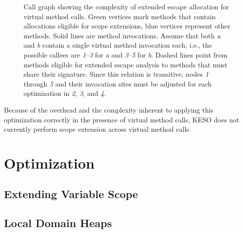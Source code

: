 			\begin{figure}
				\centering%

				\caption[Call graph showing the complexity of extended escape allocation for virtual method calls]{%
					Call graph showing the complexity of extended escape allocation for virtual method calls. Green
					{\color{cggreen}\blacksquare} vertices mark methods that contain allocations eligible for scope extensions,
					blue {\color{cgblue}\blacksquare} vertices represent other methods. Solid lines are method invocations. Assume
					that both \emph{a} and \emph{b} contain a single virtual method invocation each, i.e., the possible callees
					are \emph{1}–\emph{3} for \emph{a} and \emph{3}–\emph{5} for \emph{b}. Dashed lines point from methods
					eligible for extended escape analysis to methods that must share their signature. Since this relation is
					transitive, nodes \emph{1} through \emph{5} and their invocation sites must be adjusted for each optimization
					in \emph{2}, \emph{3}, and \emph{4}.}%
				\label{fig:eea:analysis:virtual}%
			\end{figure}

			Because of the overhead and the complexity inherent to applying this optimization correctly in the presence of
			virtual method calls, KESO does not currently perform scope extension across virtual method calls.


	\section{Optimization}
		\label{sec:eea:opt}

		\subsection{Extending Variable Scope}
			\label{sub:eea:opt:scopeext}

		\subsection{Local Domain Heaps}
			\label{sub:eea:opt:ldh}

